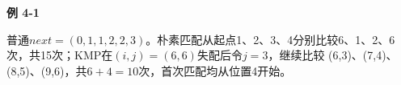 {\color{ink}\bfseries 例 4-1}\par\vspace{1bp}普通\(next=\allowbreak{}(0,\allowbreak{}1,\allowbreak{}1,\allowbreak{}2,\allowbreak{}2,\allowbreak{}3)\)。朴素匹配从起点1、2、3、4分别比较6、1、2、6次，共15次；KMP在\((i,\allowbreak{}j)=\allowbreak{}(6,\allowbreak{}6)\)失配后令\(j=\allowbreak{}3\)，继续比较 (6,\allowbreak{}3)、(7,\allowbreak{}4)、(8,\allowbreak{}5)、(9,\allowbreak{}6)，共\(6+\allowbreak{}4=\allowbreak{}10\)次，首次匹配均从位置4开始。
